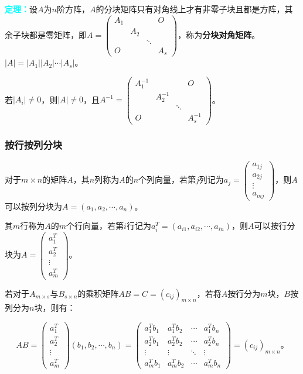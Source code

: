 \documentclass[UTF8, 12pt]{ctexart}
\begin{document}
\textcolor{aqua}{\textbf{定理：}}设$A$为$n$阶方阵，$A$的分块矩阵只有对角线上才有非零子块且都是方阵，其余子块都是零矩阵，即$A=\left(
    \begin{array}{cccc}
        A_1 & & & O \\
         & A_2 & \\
         & & \ddots & \\
        O & & & A_s
    \end{array}
\right)$，称为\textbf{分块对角矩阵}。$\vert A\vert=\vert A_1\vert\vert A_2\vert\cdots\vert A_s\vert$。

若$\vert A_i\vert\neq0$，则$\vert A\vert\neq0$，且$A^{-1}=\left(
    \begin{array}{cccc}
        A_1^{-1} & & & O \\
         & A_2^{-1} & \\
         & & \ddots & \\
        O & & & A_s^{-1}
    \end{array}
\right)$。

\subsubsection{按行按列分块}

对于$m\times n$的矩阵$A$，其$n$列称为$A$的$n$个列向量，若第$j$列记为$a_j=\left(
    \begin{array}{c}
        a_{1j} \\
        a_{2j} \\
        \vdots \\
        a_{mj}
    \end{array}
\right)$，则$A$可以按列分块为$A=(a_1,a_2,\cdots,a_n)$。

其$m$行称为$A$的$m$个行向量，若第$i$行记为$a_i^T=(a_{i1},a_{i2},\cdots,a_{in})$，则$A$可以按行分块为$A=\left(\begin{array}{c}
    a_1^T \\
    a_2^T \\
    \vdots \\
    a_{m}^T
\end{array}\right)$。

若对于$A_{m\times s}$与$B_{s\times n}$的乘积矩阵$AB=C=(c_{ij})_{m\times n}$，若将$A$按行分为$m$块，$B$按列分为$n$块，则有：

$$AB=\left(
    \begin{array}{c}
        a_1^T \\
        a_2^T \\
        \vdots \\
        a_{m}^T
    \end{array}
\right)(b_1,b_2,\cdots,b_n)=\left(
    \begin{array}{cccc}
        a_1^Tb_1 & a_1^Tb_2 & \cdots & a_1^Tb_n \\
        a_2^Tb_1 & a_2^Tb_2 & \cdots & a_2^Tb_n \\
        \vdots & \vdots & \ddots & \vdots \\
        a_{m}^Tb_1 & a_{m}^Tb_2 & \cdots & a_{m}^Tb_n
    \end{array}
\right)=(c_{ij})_{m\times n}\text{。}$$
\end{document}
